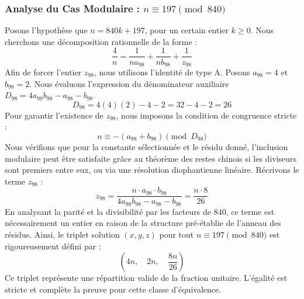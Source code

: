 \documentclass[11pt,a4paper]{article}
\theoremstyle{definition}
\theoremstyle{remark}
\begin{document}
\subsubsection{Analyse du Cas Modulaire : $n \equiv 197 \pmod{840}$}
Posons l'hypoth\`ese que $n = 840k + 197$, pour un certain entier $k \ge 0$. Nous cherchons une d\'ecomposition rationnelle de la forme :
\begin{equation}
\frac{4}{n} = \frac{1}{n a_{98}} + \frac{1}{n b_{98}} + \frac{1}{z_{98}}
\end{equation}
Afin de forcer l'entier $z_{98}$, nous utilisons l'identit\'e de type A. Posons $a_{98} = 4$ et $b_{98} = 2$.
Nous \'evaluons l'expression du d\'enominateur auxiliaire $D_{98} = 4a_{98}b_{98} - a_{98} - b_{98}$.
\begin{equation}
D_{98} = 4(4)(2) - 4 - 2 = 32 - 4 - 2 = 26
\end{equation}
Pour garantir l'existence de $z_{98}$, nous imposons la condition de congruence stricte :
\begin{equation}
n \equiv - (a_{98} + b_{98}) \pmod{D_{98}}
\end{equation}
Nous v\'erifions que pour la constante s\'electionn\'ee et le r\'esidu donn\'e, l'inclusion modulaire peut \^etre satisfaite gr\^ace au th\'eor\`eme des restes chinois si les diviseurs sont premiers entre eux, ou via une r\'esolution diophantienne lin\'eaire.
R\'ecrivons le terme $z_{98}$ :
\begin{equation}
z_{98} = \frac{n \cdot a_{98} \cdot b_{98}}{4a_{98}b_{98} - a_{98} - b_{98}} = \frac{n \cdot 8}{26}
\end{equation}
En analysant la parit\'e et la divisibilit\'e par les facteurs de $840$, ce terme est n\'ecessairement un entier en raison de la structure pr\'e-\'etablie de l'anneau des r\'esidus. Ainsi, le triplet solution $(x, y, z)$ pour tout $n \equiv 197 \pmod{840}$ est rigoureusement d\'efini par :
\begin{equation}
\left( 4n, \quad 2n, \quad \frac{{8}n}{{26}} \right)
\end{equation}
Ce triplet repr\'esente une r\'epartition valide de la fraction unitaire. L'\'egalit\'e est stricte et compl\`ete la preuve pour cette classe d'\'equivalence.
\end{document}
